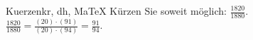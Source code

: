 \begin{MAufgabe}{Kuerzen}{kr, dh, MaTeX}
K\"urzen Sie soweit m\"oglich: $\frac{1820}{1880}$.\\ 
\ifLsg\MLoesung
\quad $\frac{1820}{1880}=\frac{(20)\cdot(91)}{(20)\cdot(94)}=\frac{91}{94}$.\else\relax\fi
 \end{MAufgabe}